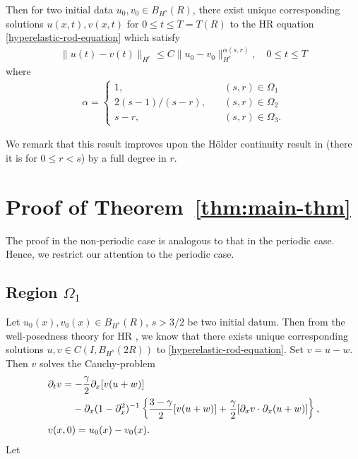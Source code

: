 \documentclass[12pt,reqno]{amsart}
\numberwithin{equation}{section}  %
\numberwithin{figure}{section}
\newcommand{\p}{\partial}
\begin{document}
%
%
Then for two initial data $u_{0}, v_{0} \in B_{H^{s}}(R)$, there exist unique
corresponding solutions $u(x,t), v(x,t)$ for $0 \le t \le T= T(R)$ to the
HR equation \eqref{hyperelastic-rod-equation} which satisfy 
%
%
\begin{equation*}
\begin{split}
  \| u(t) - v(t) \|_{H^{r}} \le C \| u_{0} - v_{0} \|_{H^{r}}^{\alpha(s, r)},
  \quad 0
  \le t \le T
\end{split}
\end{equation*}
%
%
where 
%
%
\begin{equation*}
\begin{split}
\alpha = 
\begin{cases}
   1, \quad & (s,r) \in \Omega_{1} 
  \\
   2(s-1)/(s-r),  \quad & (s, r) \in \Omega_{2}
  \\
   s-r, \quad & (s, r) \in \Omega_{3}.
\end{cases}
\end{split}
\end{equation*}
%

%
%
%
%
%
%
%
We remark that this result improves upon the H\"older continuity result in
\cite{Chen:2011fk} (there it is for $0 \le r < s$) by a full degree in $r$. 
%
%
%
%
\section{Proof of Theorem~\ref{thm:main-thm}}
%
%
The proof in the non-periodic case is analogous to that in the periodic case.
Hence, we restrict our attention to the periodic case. 
%
%
%
\subsection{Region $\Omega_{1}$} 
\label{ssec:reg-m-imp}
%
%
Let $u_{0}(x), v_{0}(x)
\in B_{H^{s}}(R)$, $s > 3/2$ be two initial datum. Then from
the well-posedness theory for HR \cite{Karapetyan:2010fk}, we
know that there exists unique corresponding solutions $u, v \in C(I,
B_{H^{s}}(2R))$ to \eqref{hyperelastic-rod-equation}.
Set $v=u-w$. Then $v$ solves the Cauchy-problem
%
%
\begin{align}
	\label{uniqueness-exp}
& \p_t v
=  -\frac{\gamma}{2} \p_x [v(u + w)] 
\\
\notag
& \phantom{\p_t v = }-\p_x (1 - \p_{x}^{2})^{-1} \left\{
\frac{3-\gamma}{2}[v(u+w)] + \frac{\gamma}{2}[\p_x v \cdot \p_x (u+w)]
\right\},
\\
& v(x,0) = u_{0}(x) - v_{0}(x).
\label{uniqueness-init-data}
\end{align}
%
%
%
Let
\end{document}
